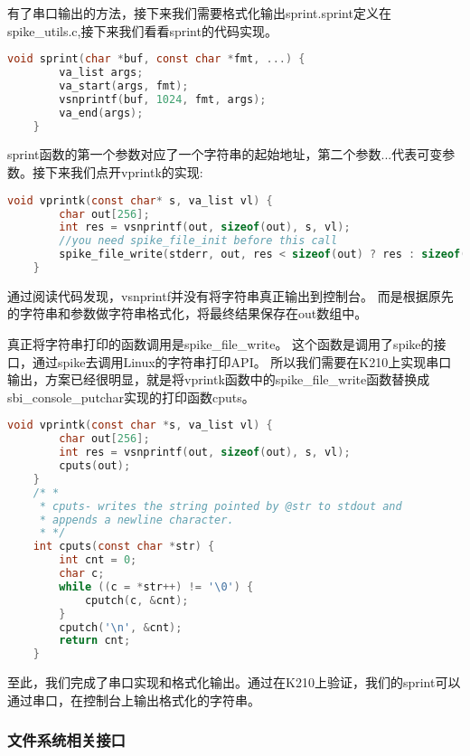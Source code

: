 有了串口输出的方法，接下来我们需要格式化输出sprint.sprint定义在spike\_utils.c,接下来我们看看sprint的代码实现。

\begin{lstlisting}[language=C, caption={sprint实现代码}, label={lst:sprint} ]
    void sprint(char *buf, const char *fmt, ...) {
        va_list args;
        va_start(args, fmt);
        vsnprintf(buf, 1024, fmt, args);
        va_end(args);
    }
\end{lstlisting}

sprint函数的第一个参数对应了一个字符串的起始地址，第二个参数...代表可变参数。接下来我们点开vprintk的实现:

\begin{lstlisting}[language=C, caption={vprintk实现代码}, label={lst:vprintk} ]
    void vprintk(const char* s, va_list vl) {
        char out[256];
        int res = vsnprintf(out, sizeof(out), s, vl);
        //you need spike_file_init before this call
        spike_file_write(stderr, out, res < sizeof(out) ? res : sizeof(out));
    }
\end{lstlisting}

通过阅读代码发现，vsnprintf并没有将字符串真正输出到控制台。
而是根据原先的字符串和参数做字符串格式化，将最终结果保存在out数组中。

真正将字符串打印的函数调用是spike\_file\_write。
这个函数是调用了spike的接口，通过spike去调用Linux的字符串打印API。
所以我们需要在K210上实现串口输出，方案已经很明显，就是将vprintk函数中的spike\_file\_write函数替换成sbi\_console\_putchar实现的打印函数cputs。

\begin{lstlisting}[language=C, caption={vprintk改造代码}, label={lst:vprintk_dev} ]
    void vprintk(const char *s, va_list vl) {
        char out[256];
        int res = vsnprintf(out, sizeof(out), s, vl);
        cputs(out);
    }
    /* *
     * cputs- writes the string pointed by @str to stdout and
     * appends a newline character.
     * */
    int cputs(const char *str) {
        int cnt = 0;
        char c;
        while ((c = *str++) != '\0') {
            cputch(c, &cnt);
        }
        cputch('\n', &cnt);
        return cnt;
    }   
\end{lstlisting}

至此，我们完成了串口实现和格式化输出。通过在K210上验证，我们的sprint可以通过串口，在控制台上输出格式化的字符串。

\subsubsection{文件系统相关接口}

